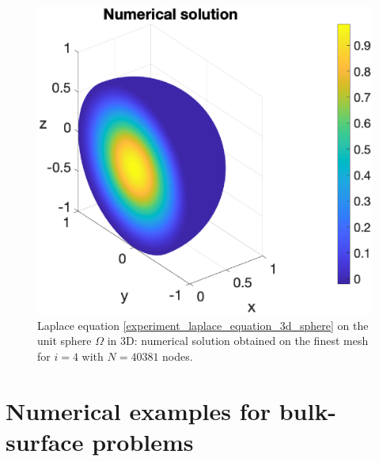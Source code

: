 \documentclass[a4paper]{article}
\begin{document}
\begin{figure}[H]
\begin{center}
\includegraphics[scale=0.5]{laplace3dsphere_Nx41.eps}
\end{center}
\caption{Laplace equation \eqref{experiment_laplace_equation_3d_sphere} on the unit sphere $\Omega$ in 3D: numerical solution obtained on the finest mesh for $i=4$ with $N= 40381$ nodes.}
\label{fig:laplace_3d_numsol_sphere}
\end{figure} 

\section{Numerical examples for bulk-surface problems}
\end{document}
